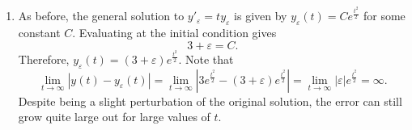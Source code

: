 \documentclass[12pt]{article}
\begin{document}
\begin{enumerate}[leftmargin=0em]
\begin{enumerate}[leftmargin=!]
        \item
        As before, the general solution to $y'_{\varepsilon} = ty_{\varepsilon}$ is given by $y_{\varepsilon}(t) = Ce^{\frac{t^2}{2}}$ for some constant $C$. Evaluating at the initial condition gives
        \[3+\varepsilon = C.\]
        Therefore, $y_{\varepsilon}(t) = (3+\varepsilon)e^{\frac{t^2}{2}}$. Note that
        \[\lim_{t \to \infty} |y(t)-y_{\varepsilon}(t)| = \lim_{t\to \infty} \left|3e^{\frac{t^2}{2}}-(3+\varepsilon)e^{\frac{t^2}{2}}\right| = \lim_{t\to \infty} \left|\varepsilon\right|e^{\frac{t^2}{2}}= \infty.\]
        Despite being a slight perturbation of the original solution, the error can still grow quite large out for large values of $t$. 
    \end{enumerate}
\end{enumerate}
\end{document}
